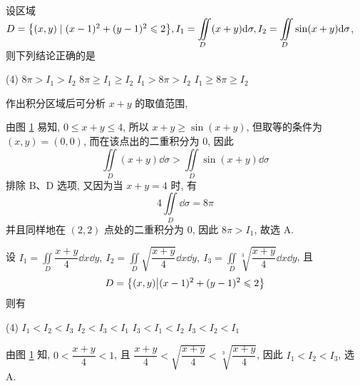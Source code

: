 \begin{example}
    设区域 $D=\qty{(x,y)\mid (x-1)^2+(y-1)^2\leqslant 2},I_1=\displaystyle\iint\limits_D (x+y)\dd \sigma,I_2=\iint\limits_D\sin(x+y)\dd \sigma$, 则下列结论正确的是
    \begin{tasks}(4)
        \task $8\pi>I_1>I_2$
        \task $8\pi\geqslant I_1\geqslant I_2$
        \task $I_1>8\pi>I_2$
        \task $I_1\geqslant 8\pi\geqslant I_2$
    \end{tasks}
\end{example}
\begin{solution}
    作出积分区域后可分析 $x+y$ 的取值范围, \\
    \begin{minipage}{0.29\linewidth}
        \begin{figure}[H]
            \centering
            \caption{}
            \label{tikz_ercjf}
        \end{figure}
    \end{minipage}\hfill
    \begin{minipage}{0.7\linewidth}
        由图 \ref{tikz_ercjf} 易知, $0\leqslant x+y\leqslant 4$, 所以 $x+y\geqslant \sin(x+y)$, 但取等的条件为 $(x,y)=(0,0)$, 而在该点出的二重积分为 0, 因此
        $$\displaystyle\iint\limits_D(x+y)\dd \sigma>\iint\limits_D\sin(x+y)\dd \sigma$$
        排除 B、D 选项, 又因为当 $x+y=4$ 时, 有
        $$4\iint\limits_D\dd \sigma=8\pi$$ 并且同样地在 $(2,2)$ 点处的二重积分为 $0$, 因此 $8\pi>I_1$, 故选 A.
    \end{minipage}
\end{solution}

\begin{example}
    设 $\displaystyle I_1=\iint\limits_D\dfrac{x+y}{4}\dd x\dd y,~I_2=\iint\limits_D\sqrt{\dfrac{x+y}{4}}\dd x\dd y,~I_3=\iint\limits_D\sqrt[3]{\dfrac{x+y}{4}}\dd x\dd y$, 
    且 $$D=\qty{(x,y)\big| (x-1)^2+(y-1)^2\leqslant 2}$$
    则有
    \begin{tasks}(4)
        \task $I_1<I_2<I_3$
        \task $I_2<I_3<I_1$
        \task $I_3<I_1<I_2$
        \task $I_3<I_2<I_1$
    \end{tasks}
\end{example}
\begin{solution}
    由图 \ref{tikz_ercjf} 知, $0<\dfrac{x+y}{4}<1$, 且 $\dfrac{x+y}{4}<\sqrt{\dfrac{x+y}{4}}<\sqrt[3]{\dfrac{x+y}{4}}$, 因此 $I_1<I_2<I_3$, 选 A.
\end{solution}

